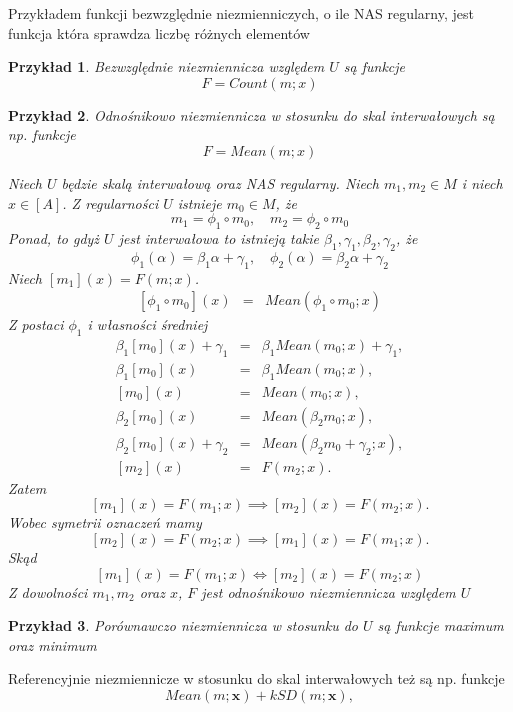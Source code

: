\documentclass[12pt,a4paper]{report}
\newtheorem{przyklad}{Przykład}
\newcommand{\domkniecie}[1]{\left\lbrack{#1}\right\rbrack}
\begin{document}
Przykładem funkcji bezwzględnie niezmienniczych, o ile NAS regularny, jest funkcja która sprawdza liczbę różnych elementów
\begin{przyklad}
Bezwzględnie niezmiennicza względem $U$ są funkcje 
$$
F=Count(m;x)
$$
\end{przyklad}
\begin{przyklad}
Odnośnikowo niezmiennicza w stosunku do skal interwałowych są np. funkcje
$$
F=Mean(m;x)
$$ 

Niech $U$ będzie skalą interwałową oraz NAS regularny.
Niech $m_1,m_2\in M$ i niech $x\in \domkniecie{A}$. Z regularności $U$ istnieje $m_0 \in M$, że
$$
m_1 = \phi_1 \circ m_0, \quad m_2=\phi_2\circ m_0
$$
Ponad, to gdyż $U$ jest interwałowa to istnieją takie $\beta_{1}, \gamma_{1}, \beta_{2}, \gamma_{2}$, że
$$
\phi_1(\alpha)=\beta_1 \alpha + \gamma_1, \quad \phi_2(\alpha)=\beta_2 \alpha + \gamma_2
$$
Niech $\domkniecie{m_1}(x)=F(m;x)$.
\begin{eqnarray*}
\domkniecie{\phi_1\circ m_0}(x) & = & Mean(\phi_1\circ m_0;x) 
\end{eqnarray*}
Z postaci $\phi_{1}$ i własności średniej
\begin{eqnarray*}
\beta_1\domkniecie{m_0}(x)+ \gamma_1 & = & \beta_1 Mean(m_0;x) + \gamma_1, \\
\beta_1\domkniecie{m_0}(x) & = & \beta_1 Mean(m_0;x), \\
\domkniecie{m_0}(x) & = & Mean(m_0;x), \\
\beta_2\domkniecie{m_0}(x) & = & Mean(\beta_2 m_0;x), \\
\beta_2\domkniecie{m_0}(x) + \gamma_2 & = & Mean(\beta_2 m_0 + \gamma_2;x),  \\
\domkniecie{m_2}(x) & = & F(m_2;x) .
\end{eqnarray*}
Zatem
$$
\domkniecie{m_1}(x)=F(m_1;x) \implies \domkniecie{m_2}(x)=F(m_2;x).
$$
Wobec symetrii oznaczeń mamy
$$
\domkniecie{m_2}(x)=F(m_2;x) \implies \domkniecie{m_1}(x)=F(m_1;x).
$$
Skąd
$$
\domkniecie{m_1}(x)=F(m_1;x) \iff \domkniecie{m_2}(x)=F(m_2;x)
$$
Z dowolności $m_1,m_2$ oraz $x$, $F$ jest odnośnikowo niezmiennicza względem $U$
\end{przyklad}
\begin{przyklad}
Porównawczo niezmiennicza w stosunku do $U$ są funkcje maximum oraz minimum
\end{przyklad}
Referencyjnie niezmiennicze w stosunku do skal interwałowych też są np. funkcje
\begin{equation*}
Mean(m;\textbf{x})+kSD(m;\textbf{x}),
\end{equation*}
\end{document}
